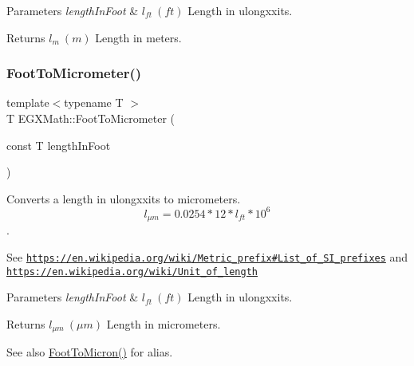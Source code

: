 \begin{DoxyParams}{Parameters}
{\em length\+In\+Foot} & $ l_{ft}\ (ft)$ Length in ulongxxits. \\
\hline
\end{DoxyParams}
\begin{DoxyReturn}{Returns}
$ l_{m}\ (m)$ Length in meters. 
\end{DoxyReturn}
\mbox{\label{group___e_g_x_math-_conversions-_length_conversions-_imperial-_foot-_s_i_ga2cb67daa37af94d5ddd376a4deda1b0c}} 
\subsubsection{\texorpdfstring{Foot\+To\+Micrometer()}{FootToMicrometer()}}
{\footnotesize\ttfamily template$<$typename T $>$ \\
T E\+G\+X\+Math\+::\+Foot\+To\+Micrometer (\begin{DoxyParamCaption}\item[{const T}]{length\+In\+Foot }\end{DoxyParamCaption})}



Converts a length in ulongxxits to micrometers. \[ l_{\mu m}=0.0254 * 12 * l_{ft} * 10^{6} \]. 

See \href{https://en.wikipedia.org/wiki/Metric_prefix#List_of_SI_prefixes}{\tt https\+://en.\+wikipedia.\+org/wiki/\+Metric\+\_\+prefix\#\+List\+\_\+of\+\_\+\+S\+I\+\_\+prefixes} and \href{https://en.wikipedia.org/wiki/Unit_of_length}{\tt https\+://en.\+wikipedia.\+org/wiki/\+Unit\+\_\+of\+\_\+length} 
\begin{DoxyParams}{Parameters}
{\em length\+In\+Foot} & $ l_{ft}\ (ft)$ Length in ulongxxits. \\
\hline
\end{DoxyParams}
\begin{DoxyReturn}{Returns}
$ l_{\mu m}\ (\mu m)$ Length in micrometers. 
\end{DoxyReturn}
\begin{DoxySeeAlso}{See also}
\mbox{\hyperlink{group___e_g_x_math-_conversions-_length_conversions-_imperial-_foot-_non-_s_i_ga0360d043c5150d90e61ad28c1fb81cc1}{Foot\+To\+Micron()}} for alias. 
\end{DoxySeeAlso}
\mbox{\label{group___e_g_x_math-_conversions-_length_conversions-_imperial-_foot-_s_i_ga51301d8a694ede90ead086b69ba7d392}} 
